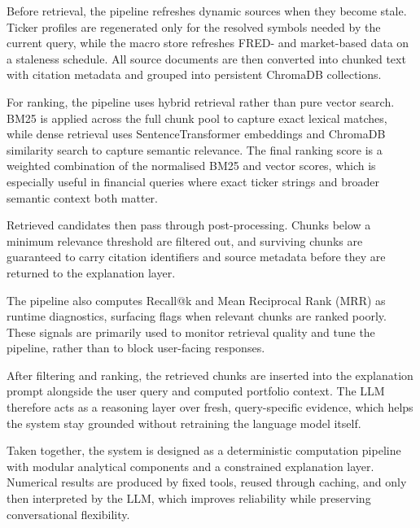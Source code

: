 Before retrieval, the pipeline refreshes dynamic sources when they become stale. Ticker profiles are regenerated only for the resolved symbols needed by the current query, while the macro store refreshes FRED- and market-based data on a staleness schedule. All source documents are then converted into chunked text with citation metadata and grouped into persistent ChromaDB collections.

For ranking, the pipeline uses hybrid retrieval rather than pure vector search. BM25 is applied across the full chunk pool to capture exact lexical matches, while dense retrieval uses SentenceTransformer embeddings and ChromaDB similarity search to capture semantic relevance. The final ranking score is a weighted combination of the normalised BM25 and vector scores, which is especially useful in financial queries where exact ticker strings and broader semantic context both matter.

Retrieved candidates then pass through post-processing. Chunks below a minimum relevance threshold are filtered out, and surviving chunks are guaranteed to carry citation identifiers and source metadata before they are returned to the explanation layer.

The pipeline also computes Recall@k and Mean Reciprocal Rank (MRR) as runtime diagnostics, surfacing flags when relevant chunks are ranked poorly. These signals are primarily used to monitor retrieval quality and tune the pipeline, rather than to block user-facing responses.

After filtering and ranking, the retrieved chunks are inserted into the explanation prompt alongside the user query and computed portfolio context. The LLM therefore acts as a reasoning layer over fresh, query-specific evidence, which helps the system stay grounded without retraining the language model itself.

Taken together, the system is designed as a deterministic computation pipeline with modular analytical components and a constrained explanation layer. Numerical results are produced by fixed tools, reused through caching, and only then interpreted by the LLM, which improves reliability while preserving conversational flexibility.


